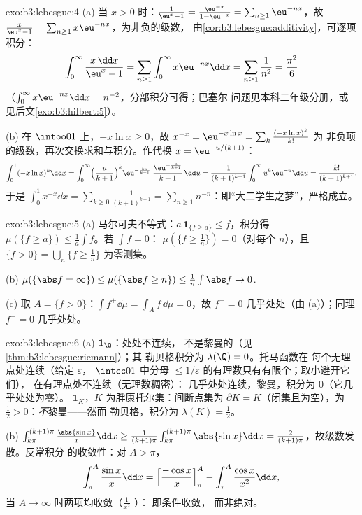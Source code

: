 \begin{solution}{exo:b3:lebesgue:4}
(a) 当 $x > 0$ 时：$\frac1{\eu^x - 1} = \frac{\eu^{-x}}{1 -
\eu^{-x}} = \sum_{n\geq1}\eu^{-nx}$，故 $\frac{x}{\eu^x - 1} =
\sum_{n\geq1}x\eu^{-nx}$，为非负的级数，
由\cref{cor:b3:lebesgue:additivity}，可逐项
积分：
\[
\int_0^\infty\frac{x\,\dd x}{\eu^x - 1}
= \sum_{n\geq1}\int_0^\infty x\eu^{-nx}\dd x
= \sum_{n\geq1}\frac1{n^2} = \frac{\pi^2}6
\]
（$\int_0^\infty x\eu^{-nx}\dd x = n^{-2}$，分部积分可得；巴塞尔
问题见本科二年级分册，或见后文\cref{exo:b3:hilbert:5}）。

(b) 在 $\intoo01$ 上，$-x\ln x \geq 0$，故 $x^{-x} =
\eu^{-x\ln x} = \sum_k\frac{(-x\ln x)^k}{k!}$ 为
非负项的级数，再次交换求和与积分。作代换 $x =
\eu^{-u/(k+1)}$：
\[
\int_0^1(-x\ln x)^k\dd x
= \int_0^\infty\Bigl(\frac{u}{k+1}\Bigr)^{k}
\eu^{-\frac{ku}{k+1}}\;\frac{\eu^{-\frac u{k+1}}}{k+1}\,\dd u
= \frac{1}{(k+1)^{k+1}}\int_0^\infty u^k\eu^{-u}\dd u
= \frac{k!}{(k+1)^{k+1}} .
\]
于是 $\int_0^1x^{-x}\dd x = \sum_{k\geq0}\frac{1}{(k+1)^{k+1}}
= \sum_{n\geq1}n^{-n}$：即“大二学生之梦”，严格成立。
\end{solution}

\begin{solution}{exo:b3:lebesgue:5}
(a) 马尔可夫不等式：$a\,\mathbf 1_{\{f \geq a\}} \leq f$，积分得
$\mu(\{f \geq a\}) \leq \frac1a\int f$。若 $\int f = 0$：
$\mu(\{f \geq \frac1n\}) = 0$（对每个 $n$），且 $\{f > 0\} =
\bigcup_n\{f \geq \frac1n\}$ 为零测集。

(b) $\mu(\{\abs f = \infty\}) \leq \mu(\{\abs f \geq n\}) \leq
\frac1n\int\abs f \to 0$.

(c) 取 $A = \{f > 0\}$：$\int f^+\dd\mu = \int_Af\,\dd\mu =
0$，故 $f^+ = 0$ 几乎处处（由 (a)）；同理 $f^- = 0$ 几乎处处。
\end{solution}

\begin{solution}{exo:b3:lebesgue:6}
(a) $\mathbf 1_\Q$：处处不连续，
不是黎曼的（见\cref{thm:b3:lebesgue:riemann}）；其
勒贝格积分为 $\lambda(\Q) = 0$。托马函数在
每个无理点处连续（给定 $\varepsilon$，
$\intcc01$ 中分母 $\leq
1/\varepsilon$ 的有理数只有有限个；取小避开它们），
在有理点处不连续（无理数稠密）：
几乎处处连续，黎曼，积分为 $0$（它几乎处处为零）。
$\mathbf 1_K$，$K$ 为胖康托尔集：间断点集为
$\partial K = K$（闭集且为空），为
$\frac12 > 0$：\emph{不}黎曼——然而
勒贝格，积分为 $\lambda(K) = \frac12$。

(b) $\int_{k\pi}^{(k+1)\pi}\frac{\abs{\sin x}}x\dd x \geq
\frac1{(k+1)\pi}\int_{k\pi}^{(k+1)\pi}\abs{\sin x}\dd x =
\frac{2}{(k+1)\pi}$，故级数发散。反常积分
的收敛性：对 $A > \pi$，
\[
\int_\pi^A\frac{\sin x}x\dd x = \Bigl[\frac{-\cos
x}x\Bigr]_\pi^A - \int_\pi^A\frac{\cos x}{x^2}\dd x,
\]
当 $A \to \infty$ 时两项均收敛（$\frac1{x^2}$ ）：
即条件收敛，
而非绝对。
\end{solution}

